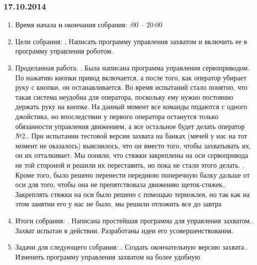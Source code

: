 \documentclass[12pt]{article}
\begin{document}
	      \subsubsection{17.10.2014}
	      \begin{enumerate}
	      	\item Время начала и окончания собрания:
	      	:00 – 20:00
	      	\item Цели собрания:
	      	.	Написать программу управления захватом и включить ее в программу управления роботом.
	      	\item Проделанная работа:
	      	.	Была написана программа управления сервоприводом. По нажатию кнопки привод включается, а после того, как оператор убирает руку с кнопки, он останавливается. Во время испытаний стало понятно, что такая система неудобна для оператора, поскольку ему нужно постоянно держать руку на кнопке. На данный момент все команды подаются с одного джойстика, но впоследствии у первого оператора останутся только обязанности управления движением, а все остальное будет делать оператор №2..	При испытании тестовой версии захвата на банках (мячей у нас на тот момент не оказалось) выяснилось, что он вместо того, чтобы захватывать их, он их отталкивает. Мы поняли, что стяжки закреплены на оси сервопривода не той стороной и решили их переставить, но пока не стали этого делать.  .	Кроме того, было решено перенести переднюю поперечную балку дальше от оси для того, чтобы она не препятствовала движению щеток-стяжек..	Закреплять стяжки на оси было решено с помощью термоклея, но так как на этом занятии его у нас не было, мы решили отложить все до завтра
	      	\newline
	      	\item Итоги собрания:
	      	.	Написана простейшая программа для управления захватом..	Захват испытан в действии. Разработаны идеи его усовершенствования.
	      	
	      	\item Задачи для следующего собрания:
	      	.	Создать окончательную версию захвата..	Изменить программу управления захватом на более удобную
	      	
	      \end{enumerate}
	      \newpage
\end{document}
